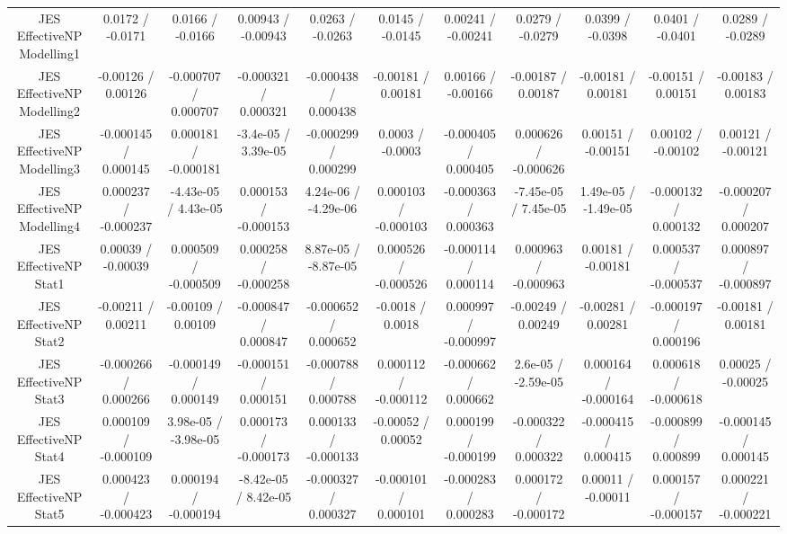 \begin{table}[htbp]
\begin{center}
\begin{tabular}{|c|c|c|c|c|c|c|c|c|c|c|}
  JES EffectiveNP Modelling1 & 0.0172 / -0.0171 & 0.0166 / -0.0166 & 0.00943 / -0.00943 & 0.0263 / -0.0263 & 0.0145 / -0.0145 & 0.00241 / -0.00241 & 0.0279 / -0.0279 & 0.0399 / -0.0398 & 0.0401 / -0.0401 & 0.0289 / -0.0289 \\ 
  JES EffectiveNP Modelling2 & -0.00126 / 0.00126 & -0.000707 / 0.000707 & -0.000321 / 0.000321 & -0.000438 / 0.000438 & -0.00181 / 0.00181 & 0.00166 / -0.00166 & -0.00187 / 0.00187 & -0.00181 / 0.00181 & -0.00151 / 0.00151 & -0.00183 / 0.00183 \\ 
  JES EffectiveNP Modelling3 & -0.000145 / 0.000145 & 0.000181 / -0.000181 & -3.4e-05 / 3.39e-05 & -0.000299 / 0.000299 & 0.0003 / -0.0003 & -0.000405 / 0.000405 & 0.000626 / -0.000626 & 0.00151 / -0.00151 & 0.00102 / -0.00102 & 0.00121 / -0.00121 \\ 
  JES EffectiveNP Modelling4 & 0.000237 / -0.000237 & -4.43e-05 / 4.43e-05 & 0.000153 / -0.000153 & 4.24e-06 / -4.29e-06 & 0.000103 / -0.000103 & -0.000363 / 0.000363 & -7.45e-05 / 7.45e-05 & 1.49e-05 / -1.49e-05 & -0.000132 / 0.000132 & -0.000207 / 0.000207 \\ 
  JES EffectiveNP Stat1 & 0.00039 / -0.00039 & 0.000509 / -0.000509 & 0.000258 / -0.000258 & 8.87e-05 / -8.87e-05 & 0.000526 / -0.000526 & -0.000114 / 0.000114 & 0.000963 / -0.000963 & 0.00181 / -0.00181 & 0.000537 / -0.000537 & 0.000897 / -0.000897 \\ 
  JES EffectiveNP Stat2 & -0.00211 / 0.00211 & -0.00109 / 0.00109 & -0.000847 / 0.000847 & -0.000652 / 0.000652 & -0.0018 / 0.0018 & 0.000997 / -0.000997 & -0.00249 / 0.00249 & -0.00281 / 0.00281 & -0.000197 / 0.000196 & -0.00181 / 0.00181 \\ 
  JES EffectiveNP Stat3 & -0.000266 / 0.000266 & -0.000149 / 0.000149 & -0.000151 / 0.000151 & -0.000788 / 0.000788 & 0.000112 / -0.000112 & -0.000662 / 0.000662 & 2.6e-05 / -2.59e-05 & 0.000164 / -0.000164 & 0.000618 / -0.000618 & 0.00025 / -0.00025 \\ 
  JES EffectiveNP Stat4 & 0.000109 / -0.000109 & 3.98e-05 / -3.98e-05 & 0.000173 / -0.000173 & 0.000133 / -0.000133 & -0.00052 / 0.00052 & 0.000199 / -0.000199 & -0.000322 / 0.000322 & -0.000415 / 0.000415 & -0.000899 / 0.000899 & -0.000145 / 0.000145 \\ 
  JES EffectiveNP Stat5 & 0.000423 / -0.000423 & 0.000194 / -0.000194 & -8.42e-05 / 8.42e-05 & -0.000327 / 0.000327 & -0.000101 / 0.000101 & -0.000283 / 0.000283 & 0.000172 / -0.000172 & 0.00011 / -0.00011 & 0.000157 / -0.000157 & 0.000221 / -0.000221 \\ 

\end{tabular}
\end{center}
\end{table}
